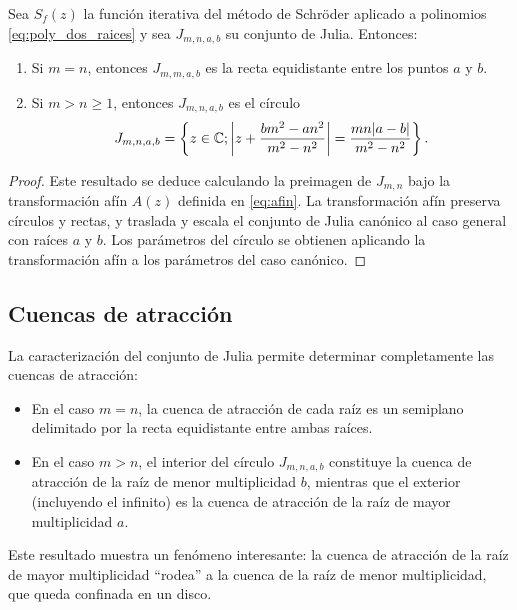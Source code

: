 \begin{teorema}
\label{teo:julia_general}
Sea $S_f(z)$ la función iterativa del método de Schröder aplicado a polinomios \eqref{eq:poly_dos_raices} y sea $J_{m,n,a,b}$ su conjunto de Julia. Entonces:
\begin{enumerate}
\item Si $m=n$, entonces $J_{m,m,a,b}$ es la recta equidistante entre los puntos $a$ y $b$.
\item Si $m>n\ge 1$, entonces $J_{m,n,a,b}$ es el círculo
\begin{equation}
J_{m,n,a,b}=\left\{z\in\mathbb{C}; \left|z+\frac{b m^2-a n^2}{m^2-n^2}\right|=\frac{mn |a-b|}{m^2-n^2}\right\}.
\label{eq:Julia_general}
\end{equation}
\end{enumerate}
\end{teorema}

\begin{proof}
Este resultado se deduce calculando la preimagen de $J_{m,n}$ bajo la transformación afín $A(z)$ definida en \eqref{eq:afin}. La transformación afín preserva círculos y rectas, y traslada y escala el conjunto de Julia canónico al caso general con raíces $a$ y $b$. Los parámetros del círculo se obtienen aplicando la transformación afín a los parámetros del caso canónico.
\end{proof}

\subsection{Cuencas de atracción}

La caracterización del conjunto de Julia permite determinar completamente las cuencas de atracción:

\begin{itemize}
\item En el caso $m=n$, la cuenca de atracción de cada raíz es un semiplano delimitado por la recta equidistante entre ambas raíces.

\item En el caso $m>n$, el interior del círculo $J_{m,n,a,b}$ constituye la cuenca de atracción de la raíz de menor multiplicidad $b$, mientras que el exterior (incluyendo el infinito) es la cuenca de atracción de la raíz de mayor multiplicidad $a$.
\end{itemize}

Este resultado muestra un fenómeno interesante: la cuenca de atracción de la raíz de mayor multiplicidad ``rodea'' a la cuenca de la raíz de menor multiplicidad, que queda confinada en un disco.

